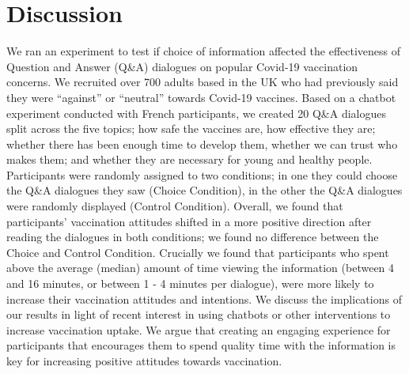 \documentclass[
  english,
  ,jou,floatsintext]{apa6}
\begin{document}
\hypertarget{discussion}{%
\section{Discussion}\label{discussion}}

We ran an experiment to test if choice of information affected the effectiveness of Question and Answer (Q\&A) dialogues on popular Covid-19 vaccination concerns. We recruited over 700 adults based in the UK who had previously said they were ``against'' or ``neutral'' towards Covid-19 vaccines. Based on a chatbot experiment conducted with French participants, we created 20 Q\&A dialogues split across the five topics; how safe the vaccines are, how effective they are; whether there has been enough time to develop them, whether we can trust who makes them; and whether they are necessary for young and healthy people. Participants were randomly assigned to two conditions; in one they could choose the Q\&A dialogues they saw (Choice Condition), in the other the Q\&A dialogues were randomly displayed (Control Condition). Overall, we found that participants' vaccination attitudes shifted in a more positive direction after reading the dialogues in both conditions; we found no difference between the Choice and Control Condition. Crucially we found that participants who spent above the average (median) amount of time viewing the information (between 4 and 16 minutes, or between 1 - 4 minutes per dialogue), were more likely to increase their vaccination attitudes and intentions. We discuss the implications of our results in light of recent interest in using chatbots or other interventions to increase vaccination uptake. We argue that creating an engaging experience for participants that encourages them to spend quality time with the information is key for increasing positive attitudes towards vaccination.
\end{document}
